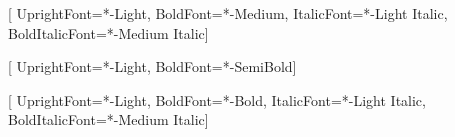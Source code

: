 
\newfontfamily{}[
  UprightFont=*-Light,
  BoldFont=*-Medium,
  ItalicFont=*-Light Italic,
  BoldItalicFont=*-Medium Italic]

\newfontfamily{}[
  UprightFont=*-Light,
  BoldFont=*-SemiBold]

\newcommand{\serif}[0]{\SourceSerifPro}
 
\setmonofont{Source Code Pro}[
  UprightFont=*-Light,
  BoldFont=*-Bold,
  ItalicFont=*-Light Italic,
  BoldItalicFont=*-Medium Italic]
